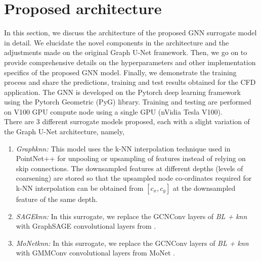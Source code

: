 \section{Proposed architecture}
In this section, we discuss the architecture of the proposed GNN surrogate model in detail. We elucidate the novel components in the architecture and the adjustments made on the original Graph U-Net framework. Then, we go on to provide comprehensive details on the hyperparameters and other implementation specifics of the proposed GNN model. Finally, we demonstrate the training process and share the predictions, training and test results obtained for the CFD application. The GNN is developed on the Pytorch deep learning framework using the Pytorch Geometric (PyG) library. Training and testing are performed on V100 GPU compute node using a single GPU (nVidia Tesla V100).\\
There are 3 different surrogate models proposed, each with a slight variation of the Graph U-Net architecture, namely, 
\begin{enumerate}
    \item \textit{Graphknn:} This model uses the k-NN interpolation technique used in PointNet++ \cite{pnpp} for unpooling or upsampling of features instead of relying on skip connections. The downsampled features at different depths (levels of coarsening) are stored so that the upsampled node co-ordinates required for k-NN interpolation can be obtained from $[c_{x}, c_{y}]$ at the downsampled feature of the same depth.
    \item \textit{SAGEknn:} In this surrogate, we replace the GCNConv layers of \textit{BL + knn} with GraphSAGE convolutional layers from \cite{SAGE}. 
    \item \textit{MoNetknn:} In this surrogate, we replace the GCNConv layers of \textit{BL + knn} with GMMConv convolutional layers from \gls{MoNet} \cite{MoNet}. 

\end{enumerate}
